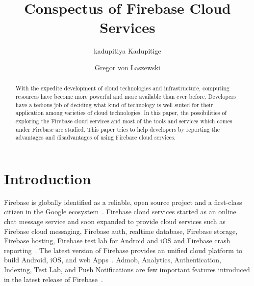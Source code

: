 \title{Conspectus of Firebase Cloud Services}


\author{kadupitiya Kadupitige}

\author{Gregor von Laszewski}


\renewcommand{\shortauthors}{G. v. Laszewski}


\begin{abstract}
With the expedite development of cloud technologies and infrastructure, 
computing resources have become more powerful and more available than ever 
before. Developers have a tedious job of deciding what kind of technology is 
well suited for their application among varieties of cloud technologies. In 
this paper, the possibilities of exploring the Firebase cloud services and most 
of the tools and services which comes under Firebase are studied. This paper 
tries to help developers by reporting the advantages and disadvantages of using 
Firebase cloud services.
\end{abstract}



\maketitle


\section{Introduction}

Firebase is globally identified as a reliable, open source project and a 
first-class citizen in the Google ecosystem~\cite{hid-sp18-409-www-firebase}. 
Firebase cloud services started as an online chat message service and soon 
expanded to provide cloud services such as Firebase cloud messaging, Firebase 
auth, realtime database, Firebase storage, Firebase hosting, Firebase test lab 
for Android and iOS and Firebase crash 
reporting~\cite{hid-sp18-409-www-firebase-official}. The latest version of 
Firebase provides an unified cloud platform to build Android, iOS, and web 
Apps~\cite{hid-sp18-409-www-firebase-official}.  Admob, Analytics, 
Authentication, Indexing, Test Lab, and Push Notifications are few important 
features introduced in the latest release of 
Firebase~\cite{hid-sp18-409-www-firebase-official}. 

